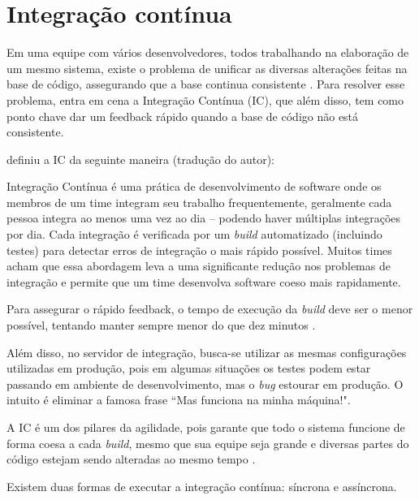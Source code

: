 

\section{Integração contínua} %
\label{sec:integracao_continua}

Em uma equipe com vários desenvolvedores, todos trabalhando na elaboração de um mesmo sistema, existe o problema de unificar as diversas alterações feitas na base de código, assegurando que a base continua consistente \cite{ImproveitCI}. Para resolver esse problema, entra em cena a Integração Contínua (IC), que além disso, tem como ponto chave dar um feedback rápido quando a base de código não está consistente.

\cite{FowlerCI} definiu a IC da seguinte maneira (tradução do autor):

\begin{citacao}
Integração Contínua é uma prática de desenvolvimento de software onde os membros de um time integram seu trabalho frequentemente, geralmente cada pessoa integra ao menos uma vez ao dia – podendo haver múltiplas integrações por dia. Cada integração é verificada por um \textit{build} automatizado (incluindo testes) para detectar erros de integração o mais rápido possível. Muitos times acham que essa abordagem leva a uma significante redução nos problemas de integração e permite que um time desenvolva software coeso mais rapidamente.
\end{citacao}

Para assegurar o rápido feedback, o tempo de execução da \textit{build} deve ser o menor possível, tentando manter sempre menor do que dez minutos \cite{FowlerCI}.

Além disso, no servidor de integração, busca-se utilizar as mesmas configurações utilizadas em produção, pois em algumas situações os testes podem estar passando em ambiente de desenvolvimento, mas o \textit{bug} estourar em produção. O intuito é eliminar a famosa frase ``Mas funciona na minha máquina!".

A IC é um dos pilares da agilidade, pois garante que todo o sistema funcione de forma coesa a cada \textit{build}, mesmo que sua equipe seja grande e diversas partes do código estejam sendo alteradas ao mesmo tempo \cite{CaelumCI}.

Existem duas formas de executar a integração contínua: síncrona e assíncrona.


